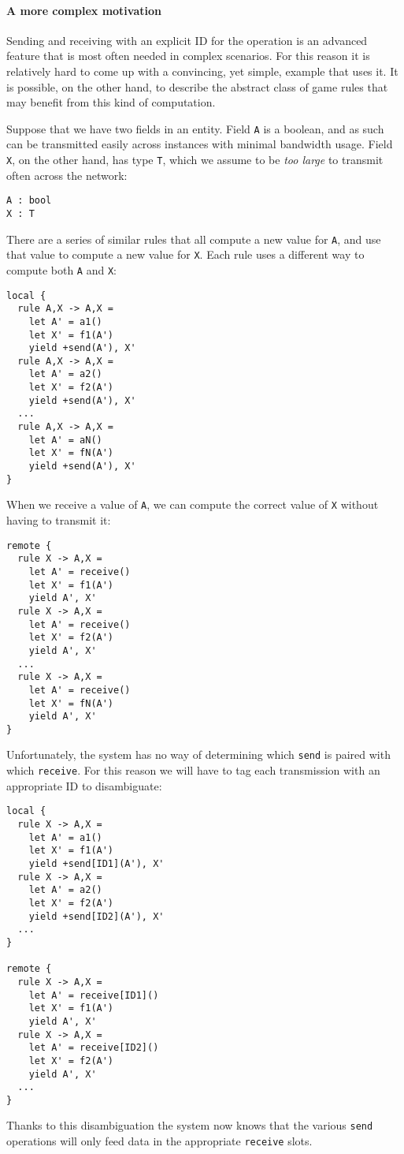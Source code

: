 \paragraph{A more complex motivation}
Sending and receiving with an explicit ID for the operation is an advanced feature that is most often needed in complex scenarios. For this reason it is relatively hard to come up with a convincing, yet simple, example that uses it. It is possible, on the other hand, to describe the abstract class of game rules that may benefit from this kind of computation.

Suppose that we have two fields in an entity. Field \texttt{A} is a boolean, and as such can be transmitted easily across instances with minimal bandwidth usage. Field \texttt{X}, on the other hand, has type \texttt{T}, which we assume to be \textit{too large} to transmit often across the network:

\begin{lstlisting}
A : bool
X : T
\end{lstlisting}

There are a series of similar rules that all compute a new value for \texttt{A}, and use that value to compute a new value for \texttt{X}. Each rule uses a different way to compute both \texttt{A} and \texttt{X}:

\begin{lstlisting}
local {
  rule A,X -> A,X = 
    let A' = a1()
    let X' = f1(A')
    yield +send(A'), X'
  rule A,X -> A,X = 
    let A' = a2()
    let X' = f2(A')
    yield +send(A'), X'
  ...
  rule A,X -> A,X = 
    let A' = aN()
    let X' = fN(A')
    yield +send(A'), X' 
}
\end{lstlisting}

When we receive a value of \texttt{A}, we can compute the correct value of \texttt{X} without having to transmit it: 

\begin{lstlisting}
remote {
  rule X -> A,X = 
    let A' = receive()
    let X' = f1(A')
    yield A', X'
  rule X -> A,X = 
    let A' = receive()
    let X' = f2(A')
    yield A', X'
  ...
  rule X -> A,X = 
    let A' = receive()
    let X' = fN(A')
    yield A', X'
}
\end{lstlisting}

Unfortunately, the system has no way of determining which \texttt{send} is paired with which \texttt{receive}. For this reason we will have to tag each transmission with an appropriate ID to disambiguate:

\begin{lstlisting}
local {
  rule X -> A,X = 
    let A' = a1()
    let X' = f1(A')
    yield +send[ID1](A'), X'
  rule X -> A,X = 
    let A' = a2()
    let X' = f2(A')
    yield +send[ID2](A'), X'
  ...
}

remote {
  rule X -> A,X = 
    let A' = receive[ID1]()
    let X' = f1(A')
    yield A', X'
  rule X -> A,X = 
    let A' = receive[ID2]()
    let X' = f2(A')
    yield A', X'
  ...
}
\end{lstlisting}

Thanks to this disambiguation the system now knows that the various \texttt{send} operations will only feed data in the appropriate \texttt{receive} slots.

